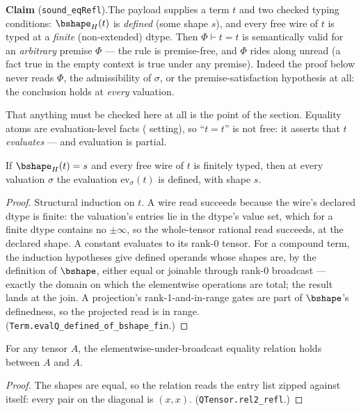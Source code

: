 

\textbf{Claim} (\texttt{sound\_eqRefl}).\enspace The payload supplies a
term $t$ and two checked typing conditions: $\bshape_H(t)$ is
\emph{defined} (some shape $s$), and every free wire of $t$ is typed at a
\emph{finite} (non-extended) dtype. Then $\Phi \vdash t = t$ is
semantically valid for an \emph{arbitrary} premise $\Phi$ --- the rule is
premise-free, and $\Phi$ rides along unread (a fact true in the empty
context is true under any premise). Indeed the proof below never reads
$\Phi$, the admissibility of $\sigma$, or the premise-satisfaction
hypothesis at all: the conclusion holds at \emph{every} valuation.

That anything must be checked here at all is the point of the section.
Equality atoms are evaluation-level facts ( setting), so
``$t = t$'' is not free: it asserts that $t$ \emph{evaluates} --- and
evaluation is partial.

\begin{blemma}\label{lem:eqrefl-total}
If $\bshape_H(t) = s$ and every free wire of $t$ is finitely typed, then
at every valuation $\sigma$ the evaluation $\mathrm{ev}_\sigma(t)$ is
defined, with shape $s$.
\end{blemma}
\begin{proof}
Structural induction on $t$. A wire read succeeds because the wire's
declared dtype is finite: the valuation's entries lie in the dtype's
value set, which for a finite dtype contains no $\pm\infty$, so the
whole-tensor rational read succeeds, at the declared shape. A constant
evaluates to its rank-0 tensor. For a compound term, the induction
hypotheses give defined operands whose shapes are, by the definition of
$\bshape$, either equal or joinable through rank-0 broadcast --- exactly
the domain on which the elementwise operations are total; the result
lands at the join. A projection's rank-1-and-in-range gates are part of
$\bshape$'s definedness, so the projected read is in range.
(\texttt{Term.evalQ\_defined\_of\_bshape\_fin}.)
\end{proof}

\begin{blemma}\label{lem:eqrefl-lift}
For any tensor $A$, the elementwise-under-broadcast equality relation
holds between $A$ and $A$.
\end{blemma}
\begin{proof}
The shapes are equal, so the relation reads the entry list zipped against
itself: every pair on the diagonal is $(x, x)$.
(\texttt{QTensor.rel2\_refl}.)
\end{proof}

